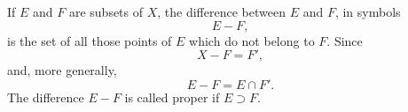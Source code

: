 If $E$ and $F$ are subsets of $X$, the difference between $E$ and $F$, in symbols
$$E - F,$$
is the set of all those points of $E$ which do not belong to $F$. Since
$$X - F = F',$$
and, more generally,
$$E - F = E \cap F'.$$
The difference $E - F$ is called proper if $E \supset F$.
